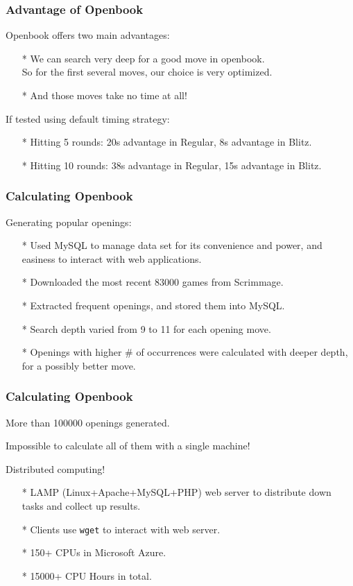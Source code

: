 \documentclass[10pt]{beamer}
\begin{document}
	\begin{frame}
		\frametitle{Advantage of Openbook}
		Openbook offers two main advantages:
		\begin{itemize}
		\item[*] We can search very deep for a good move in openbook.\\
		         So for the first several moves, our choice is very optimized.
		\item[*] And those moves take no time at all!
		\end{itemize}
		\pause
		If tested using default timing strategy:
		\begin{itemize}
		\item[*] Hitting \textcolor{fgreen}{5} rounds: \textcolor{fgreen}{20s} advantage in Regular, \textcolor{fgreen}{8s} advantage in Blitz.
		\item[*] Hitting \textcolor{fgreen}{10} rounds: \textcolor{fgreen}{38s} advantage in Regular, \textcolor{fgreen}{15s} advantage in Blitz.
		\end{itemize}
	\end{frame}

	\begin{frame}
		\frametitle{Calculating Openbook}
		Generating popular openings:
		\begin{itemize}
		\item[*] Used MySQL to manage data set for its convenience and power,
		and easiness to interact with web applications.
		\item[*] Downloaded the most recent 83000 games from Scrimmage.
		\item[*] Extracted frequent openings, and stored them into MySQL.
		\item[*] Search depth varied from \textcolor{fgreen}{9} to \textcolor{fgreen}{11} for each opening move.
		\item[*] Openings with higher \# of occurrences were calculated with deeper depth, for a possibly better move.
		\end{itemize}
	\end{frame}

	\begin{frame}
		\frametitle{Calculating Openbook}
		More than \textcolor{dred}{100000} openings generated.

		Impossible to calculate all of them with a single machine!\pause

		\textcolor{fgreen}{Distributed computing!}

		\begin{itemize}
		\item[*] LAMP (Linux+Apache+MySQL+PHP) web server to distribute down tasks and collect up results.
		\item[*] Clients use {\tt wget} to interact with web server.
		\item[*] \textcolor{fgreen}{150+} CPUs in Microsoft Azure.
		\item[*] \textcolor{fgreen}{15000+} CPU Hours in total.
		\end{itemize}
	\end{frame}
\end{document}
